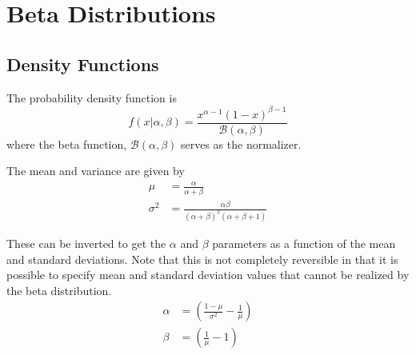 \documentclass[../../main.tex]{subfiles}
\begin{document}
\chapter{Beta Distributions}

\section{Density Functions}
The probability density function is
\[
    f\left(x| \alpha, \beta \right) =
    \frac{
        x^{\alpha-1} (1 - x)^{\beta-1}
    }
    {
        \mathcal{B}(\alpha, \beta)
    }
\]
where the beta function, $\mathcal{B}(\alpha, \beta)$ serves as the
normalizer.

The mean and variance are given by
\begin{align}
    \mu &= \frac{\alpha }{ \alpha + \beta} \\
    \sigma^2 &= \frac{\alpha \beta}{ (\alpha + \beta)^2 (\alpha + \beta + 1)} 
\end{align}

These can be inverted to get the $\alpha$ and $\beta$ parameters as a function
of the mean and standard deviations.  Note that this is not completely
reversible in that it is possible to specify mean and standard deviation
values that cannot be realized by the beta distribution.
\begin{align}
    \alpha &= \left( \frac{1-\mu}{\sigma^2} - \frac{1}{\mu} \right) \\
    \beta &= \left( \frac{1}{\mu}  - 1 \right)
\end{align}
\end{document}
